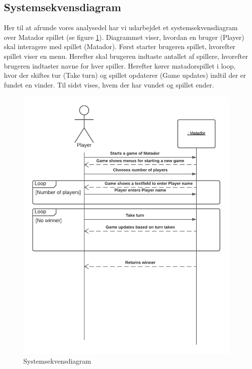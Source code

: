 \begin{flushleft}
\subsection{Systemsekvensdiagram}
Her til at afrunde vores analysedel har vi udarbejdet et systemsekvensdiagram over Matador spillet (se figure \ref{Systemsekvensdiagram}). Diagrammet viser, hvordan en bruger (Player) skal interagere med spillet (Matador). Først starter brugeren spillet, hvorefter spillet viser en menu. Herefter skal brugeren indtaste antallet af spillere, hvorefter brugeren indtaster navne for hver spiller. Herefter kører matadorspillet i loop, hvor der skiftes tur (Take turn) og spillet opdaterer (Game updates) indtil der er fundet en vinder. Til sidst vises, hvem der har vundet og spillet ender.
\begin{figure}[htp]
    \centering
    \includegraphics[width=13cm]{Report/figures/System Sekvens Diagram.png}
    \caption{Systemsekvensdiagram}
    \label{Systemsekvensdiagram}
\end{figure}

\end{flushleft}
